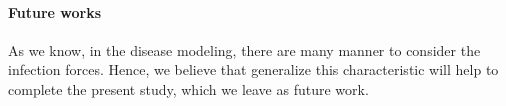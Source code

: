 	\paragraph{Future works}
As we know, in the disease modeling, there are many manner to consider the 
infection forces. Hence, we believe that generalize this characteristic will 
help to complete the present study, which we leave as future work.